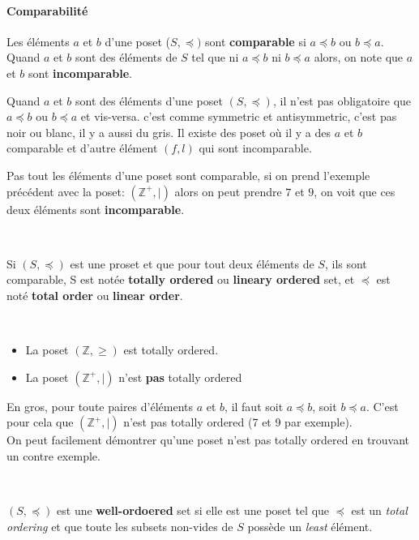 \paragraph{Comparabilité}
\begin{definition}[Comparabilité]
    Les éléments $a$ et $b$ d'une poset ($S, \preceq)$ sont \textbf{comparable} si $a \preceq b$ ou $b \preceq a$. Quand $a$ et $b$ sont des éléments de $S$ tel que ni $a \preceq b$ ni $b \preceq a$ alors, on note que $a$ et $b$ sont \textbf{incomparable}.
\end{definition}
\begin{framedremark}
    Quand $a$ et $b$ sont des éléments d'une poset $(S, \preceq)$, il n'est pas obligatoire que $a \preceq b$ ou $b \preceq a$ et vis-versa. c'est comme symmetric et antisymmetric, c'est pas noir ou blanc, il y a aussi du gris. Il existe des poset où il y a des $a$ et $b$ comparable et d'autre élément $(f, l)$ qui sont incomparable.
\end{framedremark}
\begin{exemple}

Pas tout les éléments d'une poset sont comparable, si on prend l'exemple précédent avec la poset: $(\mathbb{Z}^+, |)$ alors on peut prendre $7$ et $9$, on voit que ces deux éléments sont \textbf{incomparable}.
\end{exemple}
\\

\begin{definition}
    Si $(S, \preceq)$ est une proset et que pour tout deux éléments de $S$, ils sont comparable, S est notée \textbf{totally ordered} ou \textbf{lineary ordered} set, et $\preceq$ est noté \textbf{total order} ou \textbf{linear order}.
\end{definition}
\\
\begin{exemple}
\begin{itemize}
    \item La poset $(\mathbb{Z}, \geq)$ est totally ordered.
    \item La poset $(\mathbb{Z}^+, |)$ n'est \textbf{pas} totally ordered
\end{itemize}
En gros, pour toute paires d'éléments $a$ et $b$, il faut soit $a \preceq b$, soit $b \preceq a$. C'est pour cela que $(\mathbb{Z}^+, |)$ n'est pas totally ordered (7 et 9 par exemple).
\\
On peut facilement démontrer qu'une poset n'est pas totally ordered en trouvant un contre exemple.
\end{exemple}
\\
\begin{definition}
    $(S,\preceq)$ est une \textbf{well-ordoered} set si elle est une poset tel que $\preceq$ est un \textit{total ordering} et que toute les subsets non-vides de $S$ possède un \textit{least} élément.
\end{definition}

